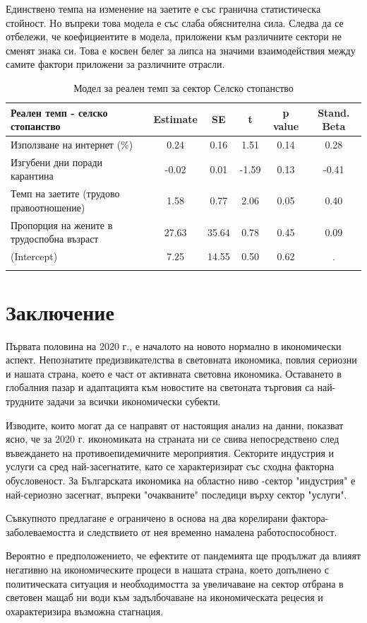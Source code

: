 \documentclass[a4paper,12pt]{article}
\begin{document}
Единствено темпа на изменение на заетите е със гранична статистическа стойност. Но въпреки това модела е със слаба обяснителна сила. Следва да се отбележи, че коефициентите в модела, приложени към различните сектори не сменят знака си. Това е косвен белег за липса на значими взаимодействия между самите фактори приложени за различните отрасли. 
\begin{table}[H]
	\centering
	\caption{Модел за реален темп за сектор Селско стопанство}
	\begin{tabular}{rccccc}
		\toprule
		\multicolumn{1}{l}{Реален темп - селско стопанство} & Estimate & SE    & t     & p value & Stand. Beta \\
		\midrule
		\multicolumn{1}{l}{Използване на интернет (\%)} & 0.24  & 0.16  & 1.51  & 0.14  & 0.28 \\
		\multicolumn{1}{l}{Изгубени дни поради карантина } & -0.02 & 0.01  & -1.59 & 0.13  & -0.41 \\
		\multicolumn{1}{l}{Темп на заетите (трудово правоотношение)} & 1.58  & 0.77  & 2.06  & 0.05  & 0.40 \\
		\multicolumn{1}{l}{Пропорция на жените в трудоспобна възраст } & 27.63 & 35.64 & 0.78  & 0.45  & 0.09 \\
		\multicolumn{1}{l}{(Intercept)} & 7.25  & 14.55 & 0.50  & 0.62  & . \\
		\midrule
		&       &       &       &       &  \\
	\end{tabular}%
	\label{tab:addlabel}%
\end{table}%


\section{Заключение}
Първата половина на 2020 г., е началото на новото нормално в икономически аспект. Непознатите предизвикателства в световната икономика, повлия сериозни и нашата страна, което е част от активната световна икономика. Оставането в глобалния пазар и адаптацията към новостите на светоната търговия са най-трудните задачи за всички икономически субекти.

Изводите, които могат да се направят от настоящия анализ на данни, показват ясно, че за 2020 г. икономиката на страната ни се свива непосредствено след въвеждането на противоепидемичните мероприятия. Секторите индустрия и услуги са сред най-засегнатите, като се характеризират със сходна факторна обусловеност. За Българската икономика на областно ниво -сектор "индустрия" е най-сериозно засегнат, въпреки "очакваните" последици върху сектор "услуги".

Съвкупното предлагане е ограничено в основа на два корелирани фактора- заболеваемостта и следствието от нея временно намалена работоспособност.

Вероятно е предположението, че ефектите от пандемията ще продължат да влияят негативно на икономическите процеси в нашата страна, което допълнено с политическата ситуация и необходимостта за увеличаване на сектор отбрана в световен мащаб ни води към задълбочаване на икономическата рецесия и охарактеризира възможна стагнация.





\end{document}
